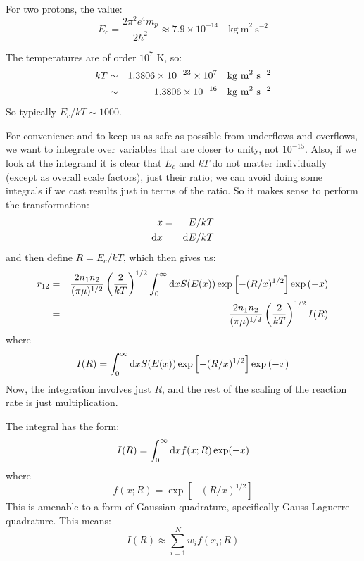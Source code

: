For two protons, the value:
\begin{equation}
E_c = \frac{2 \pi^2 e^4 m_p}{2 \hbar^2} \approx 7.9 \times 10^{-14}
\mathrm{\quad kg~m}^2\mathrm{~s}^{-2}
\end{equation}

The temperatures are of order $10^7$ K, so:
\begin{eqnarray}
  kT &\sim&
  1.3806 \times 10^{-23} \times 10^{7} \mathrm{\quad kg~m}^2\mathrm{~s}^{-2}\cr
&\sim& 
  1.3806 \times 10^{-16} \mathrm{\quad kg~m}^2\mathrm{~s}^{-2}
\end{eqnarray}
So typically $E_c/kT \sim 1000$.

For convenience and to keep us as safe as possible from underflows and
overflows, we want to integrate over variables that are closer to
unity, not $10^{-15}$. Also, if we look at the integrand it is clear
that $E_c$ and $kT$ do not matter individually (except as overall
scale factors), just their ratio; we can avoid doing some integrals if
we cast results just in terms of the ratio.  So it makes sense to
perform the transformation:
\begin{eqnarray}
 x &=& E / kT \cr
 {\rm d}x &=& {\rm d}E / kT
\end{eqnarray}
and then define $R = E_c /kT$,
which then gives us:
\begin{eqnarray}
r_{12} &=& \frac{2 n_1 n_2}{(\pi \mu)^{1/2}}
\left(\frac{2}{kT}\right)^{1/2}
\int_0^\infty {\rm d}x S(E(x))
\exp\left[-(R/x)^{1/2}\right] \exp\left(- x \right) \cr
&=& \frac{2 n_1 n_2}{(\pi \mu)^{1/2}}
\left(\frac{2}{kT}\right)^{1/2} I(R)
\end{eqnarray}
where
\begin{equation}
I(R) = \int_0^\infty {\rm d}x S(E(x))
\exp\left[-(R/x)^{1/2}\right] \exp\left(- x \right) 
\end{equation}
Now, the integration involves just $R$, and the rest of the scaling of
the reaction rate is just multiplication.

The integral has the form:
\begin{equation}
I(R) = \int_0^{\infty} {\rm d}x f(x; R) \exp(-x)
\end{equation}
where
\begin{equation}
f(x; R) = 
\exp\left[-(R/x)^{1/2}\right]
\end{equation}
This is amenable to a form of Gaussian quadrature, specifically
Gauss-Laguerre quadrature. This means:
\begin{equation}
I(R) \approx \sum_{i=1}^N w_i f(x_i; R)
\end{equation}

